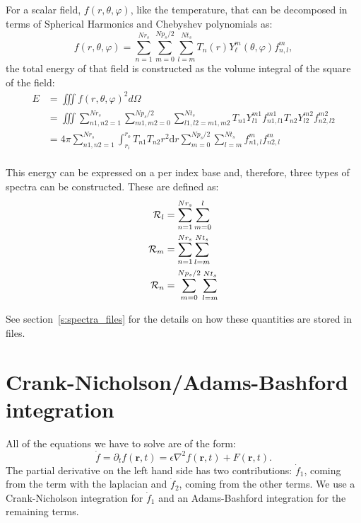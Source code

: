 \documentclass[a4paper,10pt]{book}
\renewcommand{\vec}[1]{\mathbf{#1}}
\begin{document}
For a scalar field, $f(r,\theta, \varphi)$, like the temperature, that can be
decomposed in terms of Spherical Harmonics and Chebyshev polynomials as:
\begin{equation}
 f(r,\theta, \varphi) = \sum_{n=1}^{Nr_s} \sum_{m=0}^{Np_s/2} \sum_{l=m}^{Nt_s}
           T_n(r) Y_\ell^m( \theta , \varphi ) f_{n,l}^m,
\end{equation}
the total energy of that field is constructed as the volume integral
of the square of the field:
\begin{align}
 E &= \iiint f(r,\theta, \varphi)^2 d\Omega\\
   &=\iiint \sum_{n1,n2=1}^{Nr_s} \sum_{m1,m2=0}^{Np_s/2} \sum_{l1,l2=m1,m2}^{Nt_s}
           T_{n1}Y_{l1}^{m1} f_{n1,l1}^{m1}T_{n2}Y_{l2}^{m2} f_{n2,l2}^{m2}\\
   &= 4\pi \sum_{n1,n2=1}^{Nr_s}\int_{r_i}^{r_o}T_{n1}T_{n2}  r^2 \mbox{d}r
      \sum_{m=0}^{Np_s/2} \sum_{l=m}^{Nt_s} f_{n1,l}^{m} f_{n2,l}^{m}\\
\end{align}

This energy can be expressed on a per index base and, therefore, three types of
spectra can be constructed. These are defined as:
\begin{align}
{\cal R}_l & = \sum_{n=1}^{Nr_s}\sum_{m=0}^l  \\
{\cal R}_m & = \sum_{n=1}^{Nr_s}\sum_{l=m}^{Nt_s}  \\
{\cal R}_n & = \sum_{m=0}^{Np_s/2}\sum_{l=m}^{Nt_s}
\end{align}

See section~\ref{s:spectra_files} for the details on how these quantities are
stored in files.

\section{Crank-Nicholson/Adams-Bashford integration}

All of the equations we have to solve are of the form:
\begin{equation}
 \dot f = \partial_t f(\vec{r}, t) =
          \epsilon \nabla^2 f(\vec{r}, t) + F(\vec{r}, t).
 \label{e:toBeSolved}
\end{equation}
The partial derivative on the left hand side has two contributions: $\dot f_1$,
coming from the term with the laplacian and $\dot f_2$, coming from the other
terms. We use a Crank-Nicholson integration for $\dot f_1$ and an Adams-Bashford
integration for the remaining terms.
\end{document}
